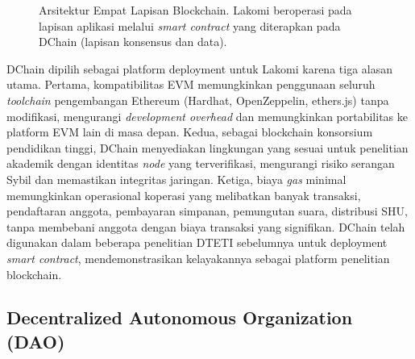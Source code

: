 \begin{figure}[H]
\centering
{}
\caption{Arsitektur Empat Lapisan Blockchain. Lakomi beroperasi pada lapisan aplikasi melalui \textit{smart contract} yang diterapkan pada DChain (lapisan konsensus dan data).}
\label{fig:blockchain-architecture}
\end{figure}

DChain dipilih sebagai platform deployment untuk Lakomi karena tiga alasan utama. Pertama, kompatibilitas EVM memungkinkan penggunaan seluruh \textit{toolchain} pengembangan Ethereum (Hardhat, OpenZeppelin, ethers.js) tanpa modifikasi, mengurangi \textit{development overhead} dan memungkinkan portabilitas ke platform EVM lain di masa depan. Kedua, sebagai blockchain konsorsium pendidikan tinggi, DChain menyediakan lingkungan yang sesuai untuk penelitian akademik dengan identitas \textit{node} yang terverifikasi, mengurangi risiko serangan Sybil dan memastikan integritas jaringan. Ketiga, biaya \textit{gas} minimal memungkinkan operasional koperasi yang melibatkan banyak transaksi, pendaftaran anggota, pembayaran simpanan, pemungutan suara, distribusi SHU, tanpa membebani anggota dengan biaya transaksi yang signifikan. DChain telah digunakan dalam beberapa penelitian DTETI sebelumnya untuk deployment \textit{smart contract}, mendemonstrasikan kelayakannya sebagai platform penelitian blockchain.

\subsection{Decentralized Autonomous Organization (DAO)}


